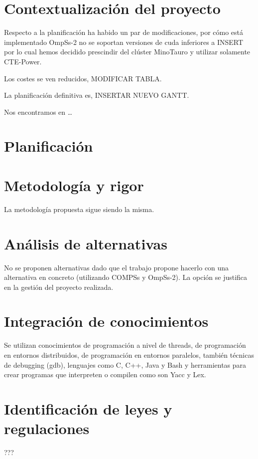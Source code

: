 \section{Contextualización del proyecto}

Respecto a la planificación ha habido un par de modificaciones, por cómo está implementado OmpSs-2 no se soportan versiones de cuda inferiores a INSERT por lo cual hemos decidido prescindir del clúster MinoTauro y utilizar solamente CTE-Power.

Los costes se ven reducidos, MODIFICAR TABLA.

La planificación definitiva es, INSERTAR NUEVO GANTT. 

Nos encontramos en …

\section{Planificación}

\section{Metodología y rigor}

La metodología propuesta sigue siendo la misma.

\section{Análisis de alternativas}

No se proponen alternativas dado que el trabajo propone hacerlo con una alternativa en concreto (utilizando COMPSs y OmpSs-2). La opción se justifica en la gestión del proyecto realizada.

\section{Integración de conocimientos}

Se utilizan conocimientos de programación a nivel de threads, de programación en entornos distribuidos, de programación en entornos paralelos, también técnicas de debugging (gdb), lenguajes como C, C++, Java y Bash y herramientas para crear programas que interpreten o compilen como son Yacc y Lex.

\section{Identificación de leyes y regulaciones}

???
